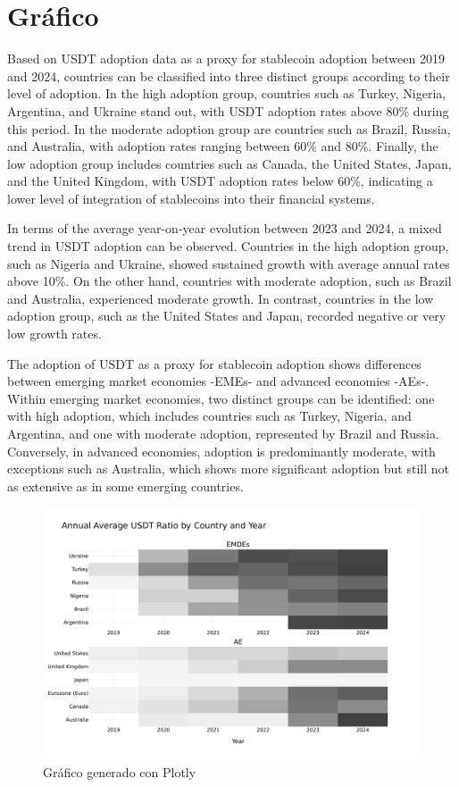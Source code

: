 \documentclass{article}
\begin{document}
\section{Gráfico}

Based on USDT adoption data as a proxy for stablecoin adoption between 2019 and 2024, countries can be classified into three distinct groups according to their level of adoption. In the high adoption group, countries such as Turkey, Nigeria, Argentina, and Ukraine stand out, with USDT adoption rates above 80\% during this period. In the moderate adoption group are countries such as Brazil, Russia, and Australia, with adoption rates ranging between 60\% and 80\%. Finally, the low adoption group includes countries such as Canada, the United States, Japan, and the United Kingdom, with USDT adoption rates below 60\%, indicating a lower level of integration of stablecoins into their financial systems.

In terms of the average year-on-year evolution between 2023 and 2024, a mixed trend in USDT adoption can be observed. Countries in the high adoption group, such as Nigeria and Ukraine, showed sustained growth with average annual rates above 10\%. On the other hand, countries with moderate adoption, such as Brazil and Australia, experienced moderate growth. In contrast, countries in the low adoption group, such as the United States and Japan, recorded negative or very low growth rates. 

The adoption of USDT as a proxy for stablecoin adoption shows differences between emerging market economies -EMEs- and advanced economies -AEs-. Within emerging market economies, two distinct groups can be identified: one with high adoption, which includes countries such as Turkey, Nigeria, and Argentina, and one with moderate adoption, represented by Brazil and Russia. Conversely, in advanced economies, adoption is predominantly moderate, with exceptions such as Australia, which shows more significant adoption but still not as extensive as in some emerging countries. 

\begin{figure}[h]
    \centering
    \includegraphics[width=1\textwidth]{graphs/usdt_ratio.pdf} %
    \caption{Gráfico generado con Plotly}
    \label{fig:grafico}
\end{figure}
\end{document}
